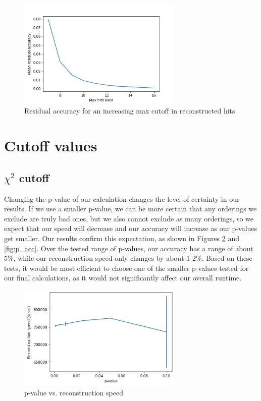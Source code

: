 \begin{figure}
    \centering
    \includegraphics[width=0.7\textwidth]{graphs/mean_resid_acc.png}
    \caption{Residual accuracy for an increasing max cutoff in reconstructed hits}
    \label{fig:hits_v_hitsUsed_resids}
\end{figure}

\section{Cutoff values}
\subsection{$\chi^2$ cutoff}
Changing the p-value of our calculation changes the level of certainty in our results. If we use a smaller p-value, we can be more certain that any orderings we exclude are truly bad ones, but we also cannot exclude as many orderings, so we expect that our speed will decrease and our accuracy will increase as our p-values get smaller. Our results confirm this expectation, as shown in Figures \ref{fig:p_speed} and \ref{fig:p_acc}. Over the tested range of p-values, our accuracy has a range of about 5\%, while our reconstruction speed only changes by about 1-2\%. Based on these tests, it would be most efficient to choose one of the smaller p-values tested for our final calculations, as it would not significantly affect our overall runtime.

\begin{figure}
    \centering
    \includegraphics[width=0.7\textwidth]{graphs/pi_p_speed.png}
    \caption{p-value vs. reconstruction speed}
    \label{fig:p_speed}
\end{figure}

